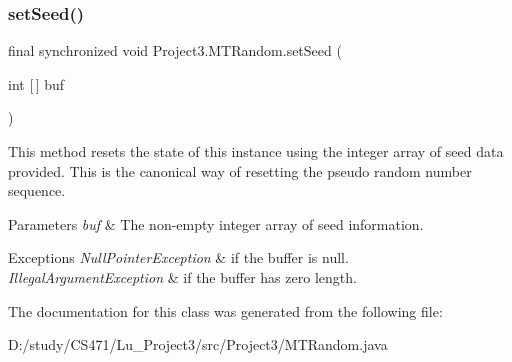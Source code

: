 \subsubsection{\texorpdfstring{setSeed()}{setSeed()}\hspace{0.1cm}{\footnotesize\ttfamily [3/3]}}
{\footnotesize\ttfamily final synchronized void Project3.\+M\+T\+Random.\+set\+Seed (\begin{DoxyParamCaption}\item[{int \mbox{[}$\,$\mbox{]}}]{buf }\end{DoxyParamCaption})}

This method resets the state of this instance using the integer array of seed data provided. This is the canonical way of resetting the pseudo random number sequence.


\begin{DoxyParams}{Parameters}
{\em buf} & The non-\/empty integer array of seed information. \\
\hline
\end{DoxyParams}

\begin{DoxyExceptions}{Exceptions}
{\em Null\+Pointer\+Exception} & if the buffer is null. \\
\hline
{\em Illegal\+Argument\+Exception} & if the buffer has zero length. \\
\hline
\end{DoxyExceptions}


The documentation for this class was generated from the following file\+:\begin{DoxyCompactItemize}
\item 
D\+:/study/\+C\+S471/\+Lu\+\_\+\+Project3/src/\+Project3/M\+T\+Random.\+java\end{DoxyCompactItemize}
